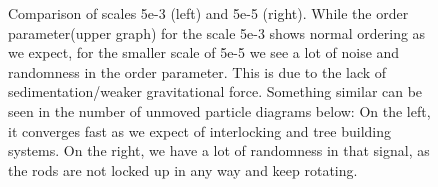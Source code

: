 \begin{figure}[h]
\begin{minipage}[t]{0.45\textwidth}
  \end{minipage}
  \caption{Comparison of scales 5e-3 (left) and 5e-5 (right). While the order parameter(upper graph) for the scale 5e-3 shows normal ordering as we expect, for the smaller scale of 5e-5 we see a lot of noise and randomness in the order parameter. This is due to the lack of sedimentation/weaker gravitational force. Something similar can be seen in the number of unmoved particle diagrams below: On the left, it converges fast as we expect of interlocking and tree building systems. On the right, we have a lot of randomness in that signal, as the rods are not locked up in any way and keep rotating.}
  \label{fig:sca_comp2}
\end{figure}
\clearpage
